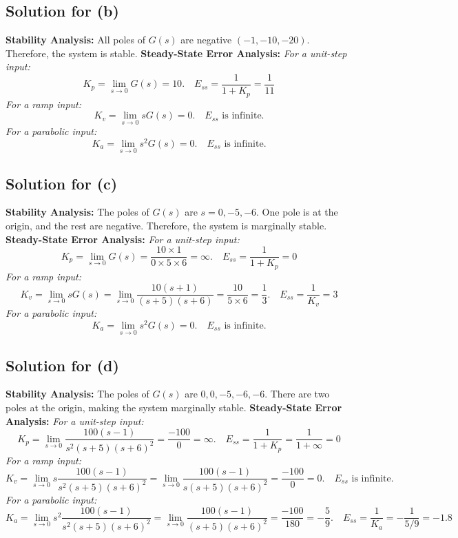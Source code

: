 \documentclass[11pt]{article}
\begin{document}
\subsection*{Solution for (b)}

\textbf{Stability Analysis:}
All poles of \(G(s)\) are negative \((-1, -10, -20)\). Therefore, the system is stable.
\newline
\textbf{Steady-State Error Analysis:}
\newline
\textit{For a unit-step input:}
\[
K_p = \lim_{{s \to 0}} G(s) = 10. \quad E_{ss} = \frac{1}{1+K_p} = \frac{1}{11}
\]
\textit{For a ramp input:}
\[
K_v = \lim_{{s \to 0}} sG(s) = 0. \quad E_{ss} \text{ is infinite.}
\]
\textit{For a parabolic input:}
\[
K_a = \lim_{{s \to 0}} s^2G(s) = 0. \quad E_{ss} \text{ is infinite.}
\]

\subsection*{Solution for (c)}

\textbf{Stability Analysis:}
The poles of \(G(s)\) are \(s = 0, -5, -6\). One pole is at the origin, and the rest are negative. Therefore, the system is marginally stable.
\newline
\textbf{Steady-State Error Analysis:}
\newline
\textit{For a unit-step input:}
\[
K_p = \lim_{{s \to 0}} G(s) = \frac{10 \times 1}{0 \times 5 \times 6} = \infty. \quad E_{ss} = \frac{1}{1+K_p} = 0
\]
\textit{For a ramp input:}
\[
K_v = \lim_{{s \to 0}} sG(s) = \lim_{{s \to 0}} \frac{10(s+1)}{(s+5)(s+6)} = \frac{10}{5 \times 6} = \frac{1}{3}. \quad E_{ss} = \frac{1}{K_v} = 3
\]
\textit{For a parabolic input:}
\[
K_a = \lim_{{s \to 0}} s^2G(s) = 0. \quad E_{ss} \text{ is infinite.}
\]
\subsection*{Solution for (d)}

\textbf{Stability Analysis:}
The poles of \(G(s)\) are \(0, 0, -5, -6, -6\). There are two poles at the origin, making the system marginally stable.
\newline
\textbf{Steady-State Error Analysis:}
\newline
\textit{For a unit-step input:}
\[
K_p = \lim_{{s \to 0}} \frac{100(s-1)}{s^2(s+5)(s+6)^2} = \frac{-100}{0} = \infty. \quad E_{ss} = \frac{1}{1+K_p} = \frac{1}{1+\infty} = 0
\]
\textit{For a ramp input:}
\[
K_v = \lim_{{s \to 0}} s \frac{100(s-1)}{s^2(s+5)(s+6)^2} = \lim_{{s \to 0}} \frac{100(s-1)}{s(s+5)(s+6)^2} = \frac{-100}{0} = 0. \quad E_{ss} \text{ is infinite.}
\]
\textit{For a parabolic input:}
\[
K_a = \lim_{{s \to 0}} s^2 \frac{100(s-1)}{s^2(s+5)(s+6)^2} = \lim_{{s \to 0}} \frac{100(s-1)}{(s+5)(s+6)^2} = \frac{-100}{180} = -\frac{5}{9}. \quad E_{ss} = \frac{1}{K_a} = -\frac{1}{5/9} = -1.8
\]
\end{document}
